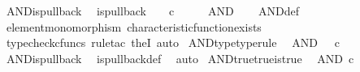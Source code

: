 \begin{isabellebody}
\isanewline
{}\isamarkupfalse%
\ AND{\isacharunderscore}{\kern0pt}is{\isacharunderscore}{\kern0pt}pullback{\isacharcolon}{\kern0pt}\isanewline
\ \ {\isachardoublequoteopen}is{\isacharunderscore}{\kern0pt}pullback\ {\isasymone}\ {\isasymone}\ {\isacharparenleft}{\kern0pt}{\isasymOmega}\ {\isasymtimes}\isactrlsub c\ {\isasymOmega}{\isacharparenright}{\kern0pt}\ {\isasymOmega}\ {\isacharparenleft}{\kern0pt}{\isasymbeta}\isactrlbsub {\isasymone}\isactrlesub {\isacharparenright}{\kern0pt}\ {\isasymt}\ {\isasymlangle}{\isasymt}{\isacharcomma}{\kern0pt}{\isasymt}{\isasymrangle}\ AND{\isachardoublequoteclose}\isanewline
%
\isadelimproof
\ \ %
\endisadelimproof
%
\isatagproof
{}\isamarkupfalse%
\ AND{\isacharunderscore}{\kern0pt}def\isanewline
\ \ \isamarkupfalse%
\ element{\isacharunderscore}{\kern0pt}monomorphism\ characteristic{\isacharunderscore}{\kern0pt}function{\isacharunderscore}{\kern0pt}exists\isanewline
\ \ \isamarkupfalse%
\ {\isacharparenleft}{\kern0pt}typecheck{\isacharunderscore}{\kern0pt}cfuncs{\isacharcomma}{\kern0pt}\ rule{\isacharunderscore}{\kern0pt}tac\ the{}I{}{\isacharcomma}{\kern0pt}\ auto{\isacharparenright}{\kern0pt}%
\endisatagproof
{\isafoldproof}%
%
\isadelimproof
\isanewline
%
\endisadelimproof
\isanewline
{}\isamarkupfalse%
\ AND{\isacharunderscore}{\kern0pt}type{\isacharbrackleft}{\kern0pt}type{\isacharunderscore}{\kern0pt}rule{\isacharbrackright}{\kern0pt}{\isacharcolon}{\kern0pt}\isanewline
\ \ {\isachardoublequoteopen}AND\ {\isacharcolon}{\kern0pt}\ {\isasymOmega}\ {\isasymtimes}\isactrlsub c\ {\isasymOmega}\ {\isasymrightarrow}\ {\isasymOmega}{\isachardoublequoteclose}\isanewline
%
\isadelimproof
\ \ %
\endisadelimproof
%
\isatagproof
{}\isamarkupfalse%
\ AND{\isacharunderscore}{\kern0pt}is{\isacharunderscore}{\kern0pt}pullback\ \isamarkupfalse%
\ is{\isacharunderscore}{\kern0pt}pullback{\isacharunderscore}{\kern0pt}def\ \isamarkupfalse%
\ auto%
\endisatagproof
{\isafoldproof}%
%
\isadelimproof
\isanewline
%
\endisadelimproof
\isanewline
{}\isamarkupfalse%
\ AND{\isacharunderscore}{\kern0pt}true{\isacharunderscore}{\kern0pt}true{\isacharunderscore}{\kern0pt}is{\isacharunderscore}{\kern0pt}true{\isacharcolon}{\kern0pt}\isanewline
\ \ {\isachardoublequoteopen}AND\ {\isasymcirc}\isactrlsub c\ {\isasymlangle}{\isasymt}{\isacharcomma}{\kern0pt}{\isasymt}{\isasymrangle}\ {\isacharequal}{\kern0pt}\ {\isasymt}{\isachardoublequoteclose}\isanewline
%
\isadelimproof

\end{isabellebody}
